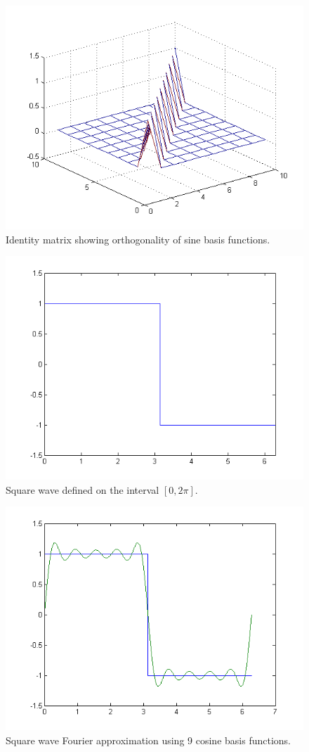 \documentclass[11pt,letterpaper]{article}
\begin{document}
\begin{enumerate}
\begin{figure}
\centering
\includegraphics[width=0.8\linewidth]{Lab7_FourierSeries1}
\caption{Identity matrix showing orthogonality of sine basis functions.}
\label{fig:Lab7_FourierSeries1}
\end{figure}

\begin{figure}
\centering
\includegraphics[width=0.8\linewidth]{Lab7_FourierSeries2}
\caption{Square wave defined on the interval $[0, 2 \pi]$.}
\label{fig:Lab7_FourierSeries2}
\end{figure}

\begin{figure}
\centering
\includegraphics[width=0.8\linewidth]{Lab7_FourierSeries3}
\caption{Square wave Fourier approximation using 9 cosine basis functions.}
\label{fig:Lab7_FourierSeries3}
\end{figure}


\end{enumerate}
\end{document}
